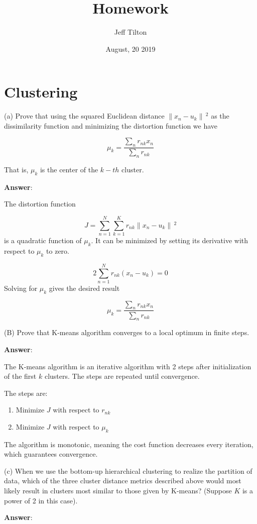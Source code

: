 \documentclass[a4paper]{article}
\title{Homework }
\author{Jeff Tilton}
\date{August, 20 2019}
\begin{document}
\maketitle

\section{Clustering}

(a) Prove that using the squared Euclidean distance $\| x_{n} - u_{k} \| \!\,^{2}$ as the dissimilarity function and minimizing the distortion function we have

$$\mu_{k} = \frac{\sum_n r_{nk}x_{n}}{\sum_n r_{nk}} $$

That is, $\mu_{k}$ is the center of the $k-th$ cluster.


\textbf{Answer}:

The distortion function

$$J = \sum_{n=1}^{N}\sum_{k=1}^{K}r_{nk}\| x_{n} - u_{k} \| \!\,^{2}$$
is a quadratic function of $\mu_k$.  It can be minimized by setting its derivative with respect to $\mu_k$ to zero.

$$2\sum_{n=1}^{N}r_{nk}(x_n - u_k) = 0$$
Solving for $\mu_k$ gives the desired result

$$\mu_{k} = \frac{\sum_n r_{nk}x_{n}}{\sum_n r_{nk}} $$\cite{bishop}

(B) Prove that K-means algorithm converges to a local optimum in finite steps.

\textbf{Answer}:

The K-means algorithm is an iterative algorithm with 2 steps after initialization of the first $k$ clusters.  The steps are repeated until convergence.

The steps are:
\begin{enumerate}
  \item Minimize $J$ with respect to $r_{nk}$
  \item Minimize $J$ with respect to $\mu_k$
\end{enumerate}

The algorithm is monotonic, meaning the cost function decreases every iteration, which guarantees convergence.


(c) When we use the bottom-up hierarchical clustering to realize the partition of data, which
of the three cluster distance metrics described above would most likely result in clusters most
similar to those given by K-means? (Suppose $K$ is a power of 2 in this case).

\textbf{Answer}:
\end{document}
